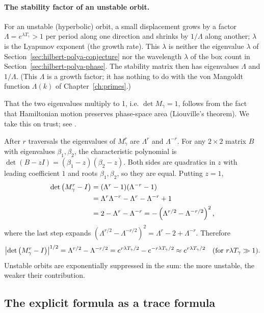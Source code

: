 \paragraph{The stability factor of an unstable orbit.} For an unstable (hyperbolic) orbit, a small displacement grows by a factor $\Lambda=e^{\lambda T_\gamma}>1$ per period along one direction and shrinks by $1/\Lambda$ along another; $\lambda$ is the Lyapunov exponent (the growth rate). This $\lambda$ is neither the eigenvalue $\lambda$ of Section~\ref{sec:hilbert-polya-conjecture} nor the wavelength $\lambda$ of the box count in Section~\ref{sec:hilbert-polya-phase}. The stability matrix then has eigenvalues $\Lambda$ and $1/\Lambda$. (This $\Lambda$ is a growth factor; it has nothing to do with the von Mangoldt function $\Lambda(k)$ of Chapter~\ref{ch:primes}.)
\begin{beyond}
That the two eigenvalues multiply to 1, i.e. $\det M_\gamma=1$, follows from the fact that Hamiltonian motion preserves phase-space area (Liouville's theorem). We take this on trust; see \cite{gutzwiller}.
\end{beyond}
After $r$ traversals the eigenvalues of $M^r_\gamma$ are $\Lambda^r$ and $\Lambda^{-r}$. For any $2\times2$ matrix $B$ with eigenvalues $\beta_1,\beta_2$, the characteristic polynomial is $\det(B-zI)=(\beta_1-z)(\beta_2-z)$. Both sides are quadratics in $z$ with leading coefficient $1$ and roots $\beta_1,\beta_2$, so they are equal. Putting $z=1$,
\begin{align}
\det\left(M_\gamma^r-I\right)&=(\Lambda^r-1)(\Lambda^{-r}-1)\notag\\
&=\Lambda^r\Lambda^{-r}-\Lambda^r-\Lambda^{-r}+1\notag\\
&=2-\Lambda^r-\Lambda^{-r}=-\left(\Lambda^{r/2}-\Lambda^{-r/2}\right)^2 ,
\end{align}
where the last step expands $(\Lambda^{r/2}-\Lambda^{-r/2})^2=\Lambda^r-2+\Lambda^{-r}$. Therefore
\begin{equation}
\left\lvert \det\left(M_\gamma^r-I\right)\right\rvert^{1/2}=\Lambda^{r/2}-\Lambda^{-r/2}=e^{r\lambda T_\gamma/2}-e^{-r\lambda T_\gamma/2}\approx e^{r\lambda T_\gamma/2}\quad\text{(for }r\lambda T_\gamma\gg1).
\label{eq:hilbert-polya-stab}
\end{equation}
Unstable orbits are exponentially suppressed in the sum: the more unstable, the weaker their contribution.

\subsection{The explicit formula as a trace formula}

